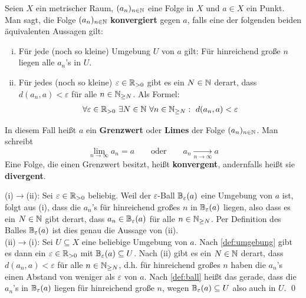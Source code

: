 \begin{de}[Konvergenz] \label{def:konvergenz}    
    Seien $X$ ein metrischer Raum, $(a_n)_{n\in \mathbb N}$ eine Folge in $X$ und $a\in X$ ein Punkt. Man sagt, die Folge $(a_n)_{n\in \mathbb N}$ \textbf{konvergiert} gegen $a$, falls eine der folgenden beiden äquivalenten Aussagen gilt:
    \begin{enumerate}[(i)]
        \item Für jede (noch so kleine) Umgebung $U$ von $a$ gilt: Für hinreichend große $n$ liegen alle $a_n$'s in $U$.
        \item Für jedes (noch so kleine) $\varepsilon \in \mathbb R_{>0}$ gibt es ein $N\in \mathbb N$ derart, dass $d(a_n,a)<\varepsilon$ für alle $n\in \mathbb N_{\ge N}$. Als Formel:
        \begin{align*}
            \forall\varepsilon\in \mathbb R_{>0}\ \exists N\in\mathbb N\ \forall n\in \mathbb N_{\ge N}:\ d(a_n,a)<\varepsilon
        \end{align*}
    \end{enumerate}
    In diesem Fall heißt $a$ ein \textbf{Grenzwert} oder \textbf{Limes} der Folge $(a_n)_{n\in \mathbb N}$. Man schreibt
        \[ \lim_{n\to\infty}a_n=a \qquad\text{oder}\qquad a_n\xrightarrow[n\to \infty]{} a \]
    Eine Folge, die einen Grenzwert besitzt, heißt \textbf{konvergent}, andernfalls heißt sie \textbf{divergent}.
\end{de}


\begin{bew}[*]
    (i)$\to$(ii): Sei $\varepsilon\in \mathbb R_{> 0}$ beliebig. Weil der $\varepsilon$-Ball $\mathbb B_\varepsilon(a)$ eine Umgebung von $a$ ist, folgt aus (i), dass die $a_n$'s für hinreichend großes $n$ in $\mathbb B_\varepsilon(a)$ liegen, also dass es ein $N\in \mathbb N$ gibt derart, dass $a_n\in \mathbb B_\varepsilon(a)$ für alle $n\in \mathbb N_{\ge N}$. Per Definition des Balles $\mathbb B_\varepsilon(a)$ ist dies genau die Aussage von (ii). \\[0.5em]
    (ii)$\to$(i): Sei $U\subseteq X$ eine beliebige Umgebung von $a$. Nach \cref{def:umgebung} gibt es dann ein $\varepsilon\in \mathbb R_{>0}$ mit $\mathbb B_\varepsilon(a)\subseteq U$. Nach (ii) gibt es ein $N\in \mathbb N$ derart, dass $d(a_n,a)<\varepsilon$ für alle $n\in \mathbb N_{\ge N}$, d.h. für hinreichend großes $n$ haben die $a_n$'s einen Abstand von weniger als $\varepsilon$ von $a$. Nach \cref{def:ball} heißt das gerade, dass die $a_n$'s in $\mathbb B_\varepsilon(a)$ liegen für hinreichend große $n$, wegen $\mathbb B_\varepsilon(a)\subseteq U$ also auch in $U$. \qed
\end{bew}


